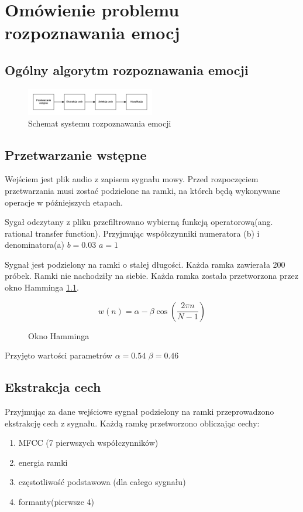 \documentclass[a4paper,12pt,twoside,openany]{report}
\begin{document}
    \chapter{Omówienie problemu rozpoznawania emocj}
    \label{ch:omowienie_problemu}

    \section{Ogólny algorytm rozpoznawania emocji}
    \label{sec:ogol}
    \begin{figure}[h]
        \centering
        \includegraphics[width=0.5\textwidth]{generic_schema}
        \caption{Schemat systemu rozpoznawania emocji}
    \end{figure}

    \section{Przetwarzanie wstępne}
    Wejściem jest plik audio z zapisem sygnału mowy.
    Przed rozpoczęciem przetwarzania musi zostać podzielone na ramki,
    na którch będą wykonywane operacje w późniejszych etapach.

    Sygał odczytany z pliku przefiltrowano wybierną funkcją operatorową(ang.  rational transfer function).
    Przyjmując współczynniki numeratora (b) i denominatora(a)
    $b = 0.03$ $a = 1$  %

    Sygnał jest podzielony na ramki o stałej długości.
    Każda ramka zawierała 200 próbek.
    Ramki nie nachodziły na siebie.
    Każda ramka została przetworzona przez okno Hamminga \ref{eq:hamming}.

    \begin{figure}
        \label{eq:hamming}
        \[w(n) = \alpha - \beta \cos(\frac{2 \pi n}{N -1})\]
        \caption{Okno Hamminga}
    \end{figure}

    Przyjęto wartości parametrów $\alpha = 0.54$ $\beta = 0.46$


    \section{Ekstrakcja cech}
    Przyjmując za dane wejściowe sygnał podzielony na ramki przeprowadzono ekstrakcję cech z sygnału.
    Każdą ramkę przetworzono obliczając cechy:
    \begin{enumerate}
        \item MFCC (7 pierwszych współczynników)
        \item energia ramki
        \item częstotliwość podstawowa (dla całego sygnału)
        \item formanty(pierwsze 4)
    \end{enumerate}
\end{document}
